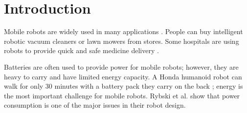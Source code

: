 \section{Introduction}
\label{sec:intro}

Mobile robots are widely used in many applications \cite{mei2005energy_consumers_identified}.
People can buy intelligent robotic vacuum cleaners or lawn mowers from stores. 
Some hospitals are using robots to provide quick and safe medicine delivery \cite{evans1994courier_hospital}.

Batteries are often used to provide power for mobile robots; however, they are heavy to carry and have limited energy capacity. 
A Honda humanoid robot can walk for only 30 minutes with a battery pack they carry on the back \cite{aylett2002machines_to_life}; 
energy is the most important challenge for mobile robots. 
Rybski et al. \cite{rybsky2000robot_rangers} show that power consumption is one of the major issues in their robot design.

